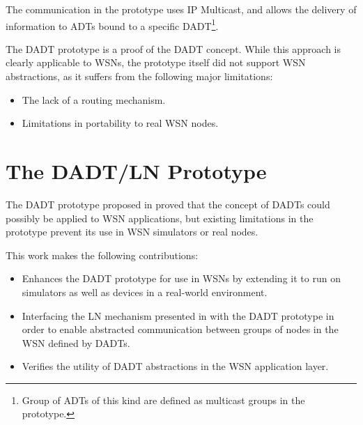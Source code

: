 The communication in the prototype uses IP Multicast, and
allows the delivery of information to ADTs bound to a specific DADT\footnote{Group of ADTs of this kind are defined as
multicast groups in the prototype.}.

The DADT prototype is a proof of the DADT concept. While this
approach is clearly applicable to WSNs, the prototype itself did not support WSN
abstractions, as it suffers from the following major limitations:

\begin{itemize}
  \item The lack of a routing mechanism.
  \item Limitations in portability to real WSN nodes.
\end{itemize}

\section{The DADT/LN Prototype}

The DADT prototype proposed in \cite{migliavacca_DADT:2006} proved that the
concept of DADTs could possibly be applied to WSN
applications, but existing limitations in the prototype prevent its use in WSN simulators or real nodes.

This work makes the following contributions:

\begin{itemize}
  \item Enhances the DADT prototype for use in WSNs by extending it to run
  on simulators as well as devices in a real-world environment.
  \item Interfacing the LN mechanism presented in \cite{mottola_LNAbstraction} with the DADT prototype in order
  to enable abstracted communication between groups of nodes in the WSN defined
  by DADTs.
  \item  Verifies the utility of DADT abstractions in the WSN
  application layer.
\end{itemize}

